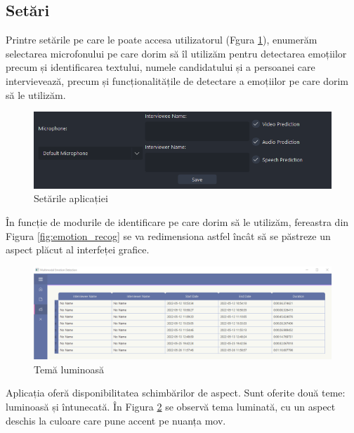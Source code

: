 \documentclass[a4paper, 12pt]{report}
\begin{document}
	\clearpage
	\subsection{Setări}
	Printre setările pe care le poate accesa utilizatorul (Fgura \ref{fig:settings}), enumerăm selectarea microfonului pe care dorim să îl utilizăm pentru detectarea emoțiilor precum și identificarea textului, numele candidatului și a persoanei care intervievează, precum și funcționalitățile de detectare a emoțiilor pe care dorim să le utilizăm.
	
	\begin{figure}[H]
		\begin{center}
			\includegraphics[scale=0.65]{images/settings.png}
		\end{center}
		\caption{Setările aplicației}
		\label{fig:settings}
	\end{figure}

	În funcție de modurile de identificare pe care dorim să le utilizăm, fereastra din Figura \ref{fig:emotion_recog} se va redimensiona astfel încât să se păstreze un aspect plăcut al interfeței grafice.
	
	\begin{figure}[H]
		\begin{center}
			\includegraphics[scale=0.3]{images/light_theme.png}
		\end{center}
		\caption{Temă luminoasă}
		\label{fig:light_theme}
	\end{figure}
	
	Aplicația oferă disponibilitatea schimbărilor de aspect. Sunt oferite două teme: luminoasă și întunecată. În Figura \ref{fig:light_theme} se observă tema luminată, cu un aspect deschis la culoare care pune accent pe nuanța mov.
\end{document}
